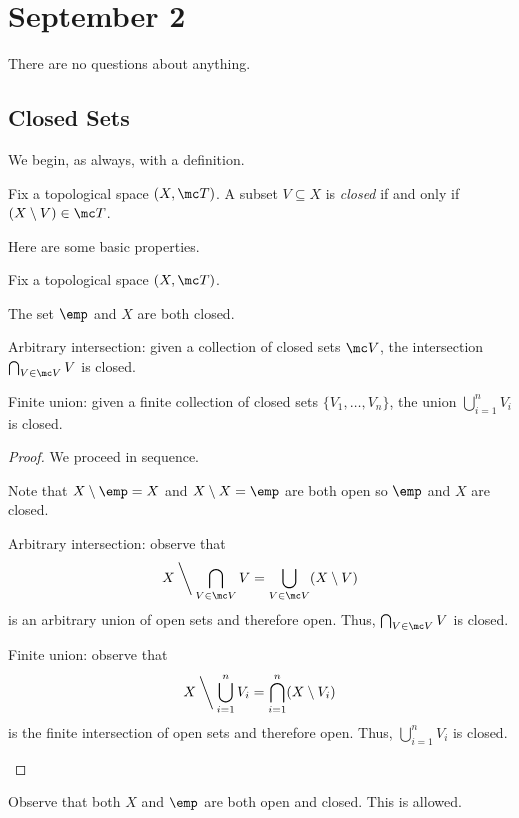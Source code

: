 \documentclass[../notes.tex]{subfiles}
\begin{document}
\section{September 2}

There are no questions about anything.

\subsection{Closed Sets}
We begin, as always, with a definition.
\begin{definition}[Closed]
	Fix a topological space $(X,\mc T)$. A subset $V\subseteq X$ is \textit{closed} if and only if $(X\setminus V)\in\mc T$.
\end{definition}
Here are some basic properties.
\begin{lemma} \label{lem:closedtop}
	Fix a topological space $(X,\mc T)$.
	\begin{listalph}
		\item The set $\emp$ and $X$ are both closed.
		\item Arbitrary intersection: given a collection of closed sets $\mc V$, the intersection $\bigcap_{V\in\mc V}V$ is closed.
		\item Finite union: given a finite collection of closed sets $\{V_1,\ldots,V_n\}$, the union $\bigcup_{i=1}^nV_i$ is closed.
	\end{listalph}
\end{lemma}
\begin{proof}
	We proceed in sequence.
	\begin{listalph}
		\item Note that $X\setminus\emp=X$ and $X\setminus X=\emp$ are both open so $\emp$ and $X$ are closed.
		\item Arbitrary intersection: observe that
		\[X\mathbin{\bigg\backslash}\bigcap_{V\in\mc V}V=\bigcup_{V\in\mc V}(X\setminus V)\]
		is an arbitrary union of open sets and therefore open. Thus, $\bigcap_{V\in\mc V}V$ is closed.
		\item Finite union: observe that
		\[X\mathbin{\bigg\backslash}\bigcup_{i=1}^nV_i=\bigcap_{i=1}^n(X\setminus V_i)\]
		is the finite intersection of open sets and therefore open. Thus, $\bigcup_{i=1}^nV_i$ is closed.
		\qedhere
	\end{listalph}
\end{proof}
\begin{remark}
	Observe that both $X$ and $\emp$ are both open and closed. This is allowed.
\end{remark}
\end{document}
